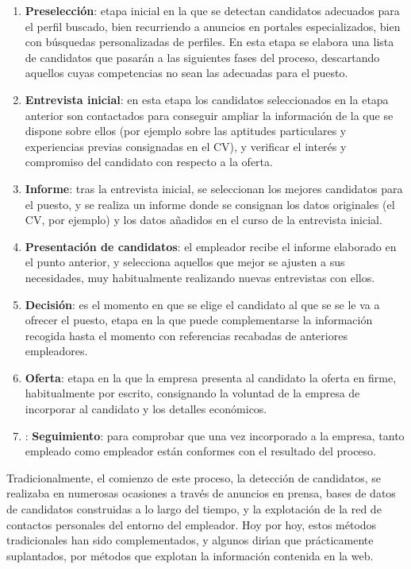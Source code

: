 \documentclass[11pt,a4paper,leqno,titlepage,twoside]{book}
\begin{document}
\begin{enumerate}
\item {\bf Preselección}: etapa inicial en la que se detectan candidatos adecuados para el perfil buscado, bien recurriendo a 
anuncios en portales especializados, bien con b\'usquedas personalizadas de perfiles. En esta etapa se elabora una lista 
de candidatos que pasar\'an a las siguientes fases del proceso, descartando aquellos cuyas competencias no sean las adecuadas
para el puesto. 
\item {\bf Entrevista inicial}: en esta etapa los candidatos seleccionados en la etapa anterior son contactados para  
conseguir ampliar la informaci\'on de la que se dispone sobre ellos  (por ejemplo sobre las aptitudes
particulares y experiencias previas consignadas en el CV), y verificar el inter\'es y compromiso del candidato
con respecto a la oferta.
\item {\bf Informe}: tras la entrevista inicial, se seleccionan los mejores candidatos para el puesto, y se realiza un informe
donde se consignan los datos originales (el CV, por ejemplo) y los datos a\~nadidos en el curso de la entrevista inicial.
\item {\bf Presentaci\'on de candidatos}: el empleador recibe el informe elaborado en el punto anterior, y selecciona aquellos
que mejor se ajusten a sus necesidades, muy habitualmente realizando nuevas entrevistas con ellos.
\item {\bf Decisi\'on}: es el momento en que se elige el candidato al que se se le va a ofrecer el puesto, etapa en la 
que puede complementarse la informaci\'on recogida hasta el momento con referencias recabadas de anteriores empleadores.
\item {\bf Oferta}: etapa en la que la empresa presenta al candidato la oferta en firme, habitualmente por escrito, consignando 
la voluntad de la empresa de incorporar al candidato y los detalles econ\'omicos. 
\item: {\bf Seguimiento}:  para comprobar que una vez incorporado a la empresa, tanto empleado como empleador est\'an conformes con
el resultado del proceso.
\end{enumerate}

Tradicionalmente, el comienzo de este proceso, la detecci\'on de candidatos, se realizaba en numerosas ocasiones 
a trav\'es de anuncios en prensa,
bases de datos de candidatos construidas a lo largo del tiempo, y la explotaci\'on de la red de contactos personales del entorno 
del empleador. Hoy por hoy, estos m\'etodos tradicionales han sido complementados, y algunos dir\'\i an que pr\'acticamente
suplantados, por m\'etodos que explotan la informaci\'on contenida en la web. 
\end{document}
